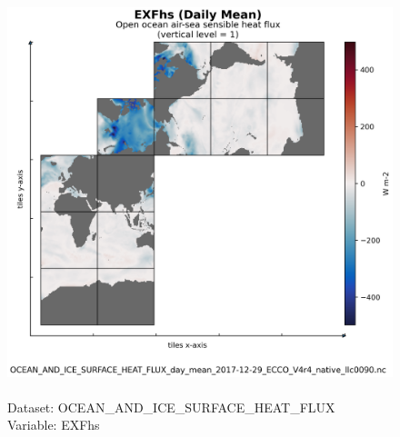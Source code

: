\begin{figure}[H]
\centering
\includegraphics[scale=0.5]{../images/plots/native_plots/Ocean_and_Sea-Ice_Surface_Heat_Fluxes/EXFhs.png}
\caption{\\Dataset: OCEAN\_AND\_ICE\_SURFACE\_HEAT\_FLUX\\Variable: EXFhs}
\label{tab:table-OCEAN_AND_ICE_SURFACE_HEAT_FLUX_EXFhs-Plot}
\end{figure}
\pagebreak
